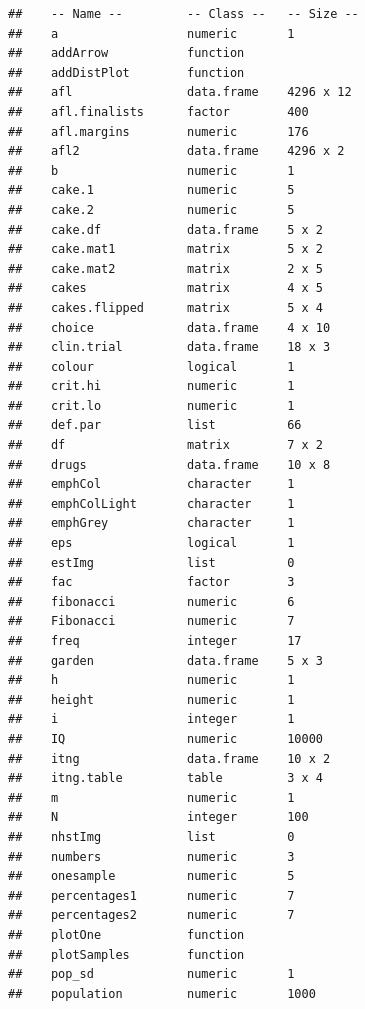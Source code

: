 \documentclass[
]{book}
\begin{document}
\begin{verbatim}
##    -- Name --         -- Class --   -- Size --
##    a                  numeric       1         
##    addArrow           function                
##    addDistPlot        function                
##    afl                data.frame    4296 x 12 
##    afl.finalists      factor        400       
##    afl.margins        numeric       176       
##    afl2               data.frame    4296 x 2  
##    b                  numeric       1         
##    cake.1             numeric       5         
##    cake.2             numeric       5         
##    cake.df            data.frame    5 x 2     
##    cake.mat1          matrix        5 x 2     
##    cake.mat2          matrix        2 x 5     
##    cakes              matrix        4 x 5     
##    cakes.flipped      matrix        5 x 4     
##    choice             data.frame    4 x 10    
##    clin.trial         data.frame    18 x 3    
##    colour             logical       1         
##    crit.hi            numeric       1         
##    crit.lo            numeric       1         
##    def.par            list          66        
##    df                 matrix        7 x 2     
##    drugs              data.frame    10 x 8    
##    emphCol            character     1         
##    emphColLight       character     1         
##    emphGrey           character     1         
##    eps                logical       1         
##    estImg             list          0         
##    fac                factor        3         
##    fibonacci          numeric       6         
##    Fibonacci          numeric       7         
##    freq               integer       17        
##    garden             data.frame    5 x 3     
##    h                  numeric       1         
##    height             numeric       1         
##    i                  integer       1         
##    IQ                 numeric       10000     
##    itng               data.frame    10 x 2    
##    itng.table         table         3 x 4     
##    m                  numeric       1         
##    N                  integer       100       
##    nhstImg            list          0         
##    numbers            numeric       3         
##    onesample          numeric       5         
##    percentages1       numeric       7         
##    percentages2       numeric       7         
##    plotOne            function                
##    plotSamples        function                
##    pop_sd             numeric       1         
##    population         numeric       1000      

\end{verbatim}
\end{document}
